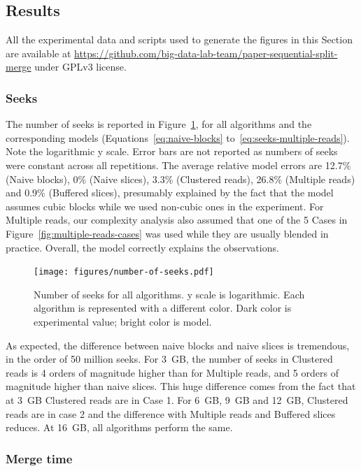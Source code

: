 \documentclass[10pt, conference, compsocconf]{IEEEtran}
\begin{document}
\subsection{Results}

All the experimental data and scripts used to generate the figures in
this Section are available at
\url{https://github.com/big-data-lab-team/paper-sequential-split-merge}
under GPLv3 license.

\subsubsection{Seeks}

The number of seeks is reported in Figure~\ref{fig:number-of-seeks},
for all algorithms and the corresponding models
(Equations~\ref{eq:naive-blocks}
to~\ref{eq:seeks-multiple-reads}). Note the logarithmic y scale. Error
bars are not reported as numbers of seeks were constant across all
repetitions. The average relative model errors are 12.7\% (Naive
blocks), 0\% (Naive slices), 3.3\% (Clustered reads), 26.8\% (Multiple
reads) and 0.9\% (Buffered slices), presumably explained by the fact
that the model assumes cubic blocks while we used non-cubic ones in
the experiment. For Multiple reads, our complexity analysis also
assumed that one of the 5 Cases in
Figure~\ref{fig:multiple-reads-cases} was used while they are usually
blended in practice. Overall, the model correctly explains the
observations.
\begin{figure}[h]
  \centering
  \texttt{[image: figures/number-of-seeks.pdf]}
  \hfill
  \caption{Number of seeks for all algorithms. y scale is logarithmic. Each algorithm is
    represented with a different color. Dark color is experimental
    value; bright color is model.}
\label{fig:number-of-seeks}
\end{figure}

As expected, the difference between naive blocks and naive slices is
tremendous, in the order of 50 million seeks. For 3~GB, the number of
seeks in Clustered reads is 4 orders of magnitude higher than for
Multiple reads, and 5 orders of magnitude higher than naive
slices. This huge difference comes from the fact that at 3~GB Clustered
reads are in Case 1. For 6~GB, 9~GB and 12~GB, Clustered reads are in
case 2 and the difference with Multiple reads and Buffered slices
reduces. At 16~GB, all algorithms perform the same.

\subsubsection{Merge time}
\end{document}
